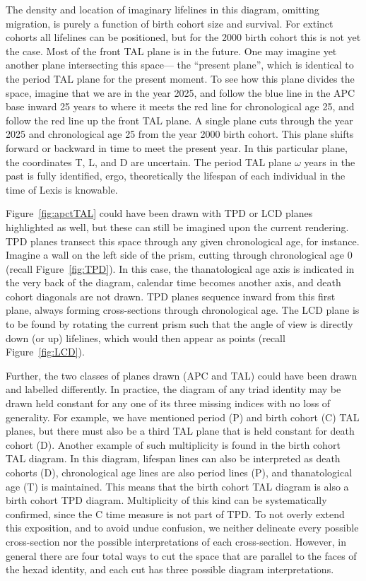 \documentclass[12pt,oneside,a4paper]{article} %
\theoremstyle{definition}
\begin{document}
The density and location of imaginary lifelines in this diagram, omitting
migration, is purely a function of birth cohort size and survival. For extinct
cohorts all lifelines can be positioned, but for the 2000 birth cohort this is
not yet the case. Most of the front TAL plane is in the future. One may imagine
yet another plane intersecting this space--- the ``present plane'', which is
identical to the period TAL plane for the present moment. To see how this plane
divides the space, imagine that we are in the year 2025, and follow the blue
line in the APC base inward 25 years to where it meets the red line for chronological age 25, and follow the
red line up the front TAL plane. A single plane cuts through the year
2025 and chronological age 25 from the year 2000 birth cohort. This plane
shifts forward or backward in time to meet the present year. In this particular
plane, the coordinates T, L, and D are uncertain. The period TAL plane $\omega$
years in the past is fully identified, ergo, theoretically the lifespan of each
individual in the time of Lexis is knowable. 

Figure~\ref{fig:apctTAL} could have been drawn with TPD or LCD planes highlighted
as well, but these can still be imagined upon the current rendering. TPD planes
transect this space through any given chronological age, for instance. Imagine a
wall on the left side of the prism, cutting through chronological age 0 (recall
Figure~\ref{fig:TPD}).
In this case, the thanatological age axis is indicated in the very back of the diagram,
calendar time becomes another axis, and death cohort diagonals are not drawn.
TPD planes sequence inward from this first plane, always forming cross-sections
through chronological age. The LCD plane is to be found by rotating the current
prism such that the angle of view is directly down (or up) lifelines, which
would then appear as points (recall Figure~\ref{fig:LCD}).

Further, the two classes of planes drawn
(APC and TAL) could have been drawn and labelled differently.
In practice, the diagram of any triad identity may be drawn held constant for any one of its
three missing indices with no loss of generality. For example, we have
mentioned period (P) and birth cohort (C) TAL planes, but there must also be a
third TAL plane that is held constant for death cohort (D). Another example
of such multiplicity is found in the birth cohort TAL diagram. In this diagram,
lifespan lines can also be interpreted as death cohorts (D), chronological age
lines are also period lines (P), and thanatological age (T) is maintained. This
means that the birth cohort TAL diagram is also a birth cohort TPD diagram.
Multiplicity of this kind can be systematically confirmed, since the C time measure is not part of TPD. To not overly extend this exposition, and to avoid undue confusion, we neither delineate every possible cross-section nor the possible interpretations of each cross-section.
However, in general there are four total ways to cut the
space that are parallel to the faces of the hexad identity, and each cut
has three possible diagram interpretations.
\end{document}
